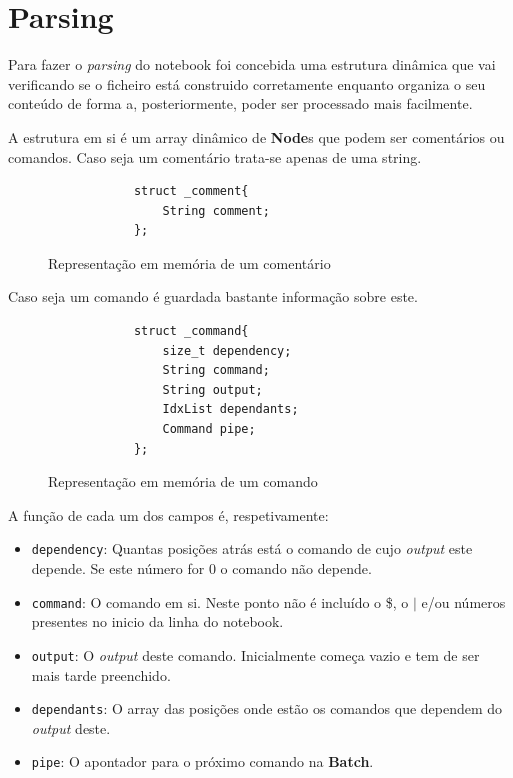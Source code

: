 \documentclass[12pt,a4paper]{report}
\begin{document}
\chapter{Parsing}
    Para fazer o \textit{parsing} do notebook foi concebida uma estrutura
    dinâmica que vai verificando se o ficheiro está construido corretamente
    enquanto organiza o seu conteúdo de forma a, posteriormente, poder ser
    processado mais facilmente.

    A estrutura em si é um array dinâmico de \textbf{Node}s que podem ser
    comentários ou comandos. Caso seja um comentário trata-se apenas de
    uma string.
    \begin{figure}[h]
        \centering
        \begin{verbatim}
            struct _comment{
                String comment;
            };
        \end{verbatim}
        \caption{Representação em memória de um comentário}
        \label{fig:commentStruct}
    \end{figure}

    Caso seja um comando é guardada bastante informação sobre este.
    \begin{figure}[h]
        \centering
        \begin{verbatim}
            struct _command{
                size_t dependency;
                String command;
                String output;
                IdxList dependants;
                Command pipe;
            };
        \end{verbatim}
        \caption{Representação em memória de um comando}
    \end{figure}

    A função de cada um dos campos é, respetivamente:
    \begin{itemize}
        \item \texttt{dependency}: Quantas posições atrás está o comando
            de cujo \textit{output} este depende. Se este número for 0 o comando
            não depende.

        \item \texttt{command}: O comando em si. Neste ponto não é
            incluído o \$, o $|$ e/ou números presentes no inicio da linha
            do notebook.

        \item \texttt{output}: O \textit{output} deste comando.
            Inicialmente começa vazio e tem de ser mais tarde preenchido.

        \item \texttt{dependants}: O array das posições onde estão os
            comandos que dependem do \textit{output} deste.

        \item \texttt{pipe}: O apontador para o próximo comando na
            \textbf{Batch}.
    \end{itemize}
\end{document}
